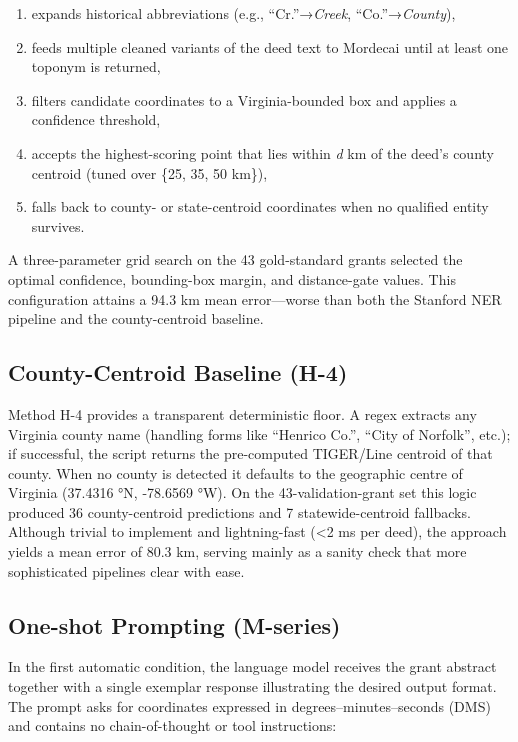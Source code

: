 \begin{enumerate}
\def\labelenumi{\arabic{enumi}.}
\tightlist
\item
  expands historical abbreviations (e.g., ``Cr.''→\emph{Creek},
  ``Co.''→\emph{County}),
\item
  feeds multiple cleaned variants of the deed text to Mordecai until at
  least one toponym is returned,
\item
  filters candidate coordinates to a Virginia-bounded box and applies a
  confidence threshold,
\item
  accepts the highest-scoring point that lies within \emph{d} km of the
  deed's county centroid (tuned over \{25, 35, 50 km\}),
\item
  falls back to county- or state-centroid coordinates when no qualified
  entity survives.
\end{enumerate}

A three-parameter grid search on the 43 gold-standard grants selected
the optimal confidence, bounding-box margin, and distance-gate values.
This configuration attains a 94.3 km mean error---worse than both the
Stanford NER pipeline and the county-centroid baseline.

\subsection{County-Centroid Baseline
(H-4)}\label{county-centroid-baseline-h-4}

Method H-4 provides a transparent deterministic floor. A regex extracts
any Virginia county name (handling forms like ``Henrico Co.'', ``City of
Norfolk'', etc.); if successful, the script returns the pre-computed
TIGER/Line centroid of that county. When no county is detected it
defaults to the geographic centre of Virginia (37.4316 °N, -78.6569 °W).
On the 43-validation-grant set this logic produced 36 county-centroid
predictions and 7 statewide-centroid fallbacks. Although trivial to
implement and lightning-fast (\textless2 ms per deed), the approach
yields a mean error of 80.3 km, serving mainly as a sanity check that
more sophisticated pipelines clear with ease.

\subsection{One-shot Prompting
(M-series)}\label{one-shot-prompting-m-series}

In the first automatic condition, the language model receives the grant
abstract together with a single exemplar response illustrating the
desired output format. The prompt asks for coordinates expressed in
degrees--minutes--seconds (DMS) and contains no chain-of-thought or tool
instructions:

